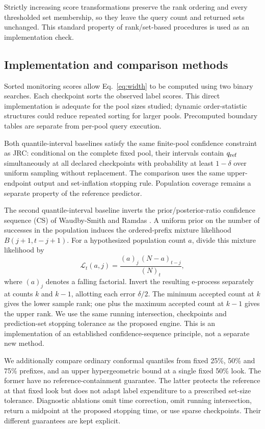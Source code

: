 \documentclass[pdflatex,sn-basic,Numbered,iicol]{sn-jnl}
\begin{document}
Strictly increasing score transformations preserve the rank ordering and every thresholded set membership, so they leave the query count and returned sets unchanged. This standard property of rank/set-based procedures is used as an implementation check.

\subsection{Implementation and comparison methods}
Sorted monitoring scores allow Eq.~\eqref{eq:width} to be computed using two binary searches. Each checkpoint sorts the observed label scores. This direct implementation is adequate for the pool sizes studied; dynamic order-statistic structures could reduce repeated sorting for larger pools. Precomputed boundary tables are separate from per-pool query execution.

Both quantile-interval baselines satisfy the same finite-pool confidence constraint as JRC: conditional on the complete fixed pool, their intervals contain $q_{\rm ref}$ simultaneously at all declared checkpoints with probability at least $1-\delta$ over uniform sampling without replacement. The comparison uses the same upper-endpoint output and set-inflation stopping rule. Population coverage remains a separate property of the reference predictor.

The second quantile-interval baseline inverts the prior/posterior-ratio confidence sequence (CS) of Waudby-Smith and Ramdas \cite{wor}. A uniform prior on the number of successes in the population induces the ordered-prefix mixture likelihood $B(j+1,t-j+1)$. For a hypothesized population count $a$, divide this mixture likelihood by
\begin{equation}
 \mathcal L_t(a,j)=
 \frac{(a)_j\,(N-a)_{t-j}}{(N)_t},
 \label{eq:likelihood}
\end{equation}
where $(a)_j$ denotes a falling factorial. Invert the resulting e-process separately at counts $k$ and $k-1$, allotting each error $\delta/2$. The minimum accepted count at $k$ gives the lower sample rank; one plus the maximum accepted count at $k-1$ gives the upper rank. We use the same running intersection, checkpoints and prediction-set stopping tolerance as the proposed engine. This is an implementation of an established confidence-sequence principle, not a separate new method.

We additionally compare ordinary conformal quantiles from fixed 25\%, 50\% and 75\% prefixes, and an upper hypergeometric bound at a single fixed 50\% look. The former have no reference-containment guarantee. The latter protects the reference at that fixed look but does not adapt label expenditure to a prescribed set-size tolerance. Diagnostic ablations omit time correction, omit running intersection, return a midpoint at the proposed stopping time, or use sparse checkpoints. Their different guarantees are kept explicit.
\end{document}
